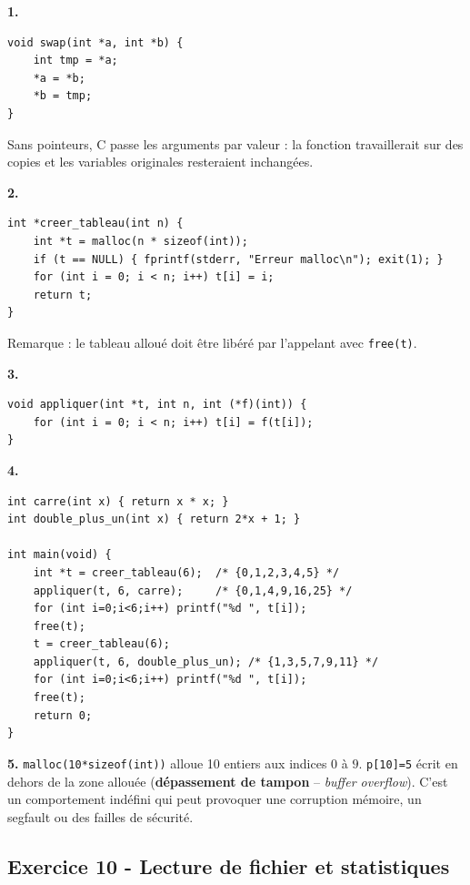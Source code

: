 \documentclass[12pt,a4paper]{article}
\begin{document}
\begin{boitecorrige}
\textbf{1.}
\begin{lstlisting}
void swap(int *a, int *b) {
    int tmp = *a;
    *a = *b;
    *b = tmp;
}
\end{lstlisting}
Sans pointeurs, C passe les arguments par valeur : la fonction travaillerait sur des copies et les variables originales resteraient inchangées.

\textbf{2.}
\begin{lstlisting}
int *creer_tableau(int n) {
    int *t = malloc(n * sizeof(int));
    if (t == NULL) { fprintf(stderr, "Erreur malloc\n"); exit(1); }
    for (int i = 0; i < n; i++) t[i] = i;
    return t;
}
\end{lstlisting}
Remarque : le tableau alloué doit être libéré par l'appelant avec \texttt{free(t)}.

\textbf{3.}
\begin{lstlisting}
void appliquer(int *t, int n, int (*f)(int)) {
    for (int i = 0; i < n; i++) t[i] = f(t[i]);
}
\end{lstlisting}

\textbf{4.}
\begin{lstlisting}
int carre(int x) { return x * x; }
int double_plus_un(int x) { return 2*x + 1; }

int main(void) {
    int *t = creer_tableau(6);  /* {0,1,2,3,4,5} */
    appliquer(t, 6, carre);     /* {0,1,4,9,16,25} */
    for (int i=0;i<6;i++) printf("%d ", t[i]);
    free(t);
    t = creer_tableau(6);
    appliquer(t, 6, double_plus_un); /* {1,3,5,7,9,11} */
    for (int i=0;i<6;i++) printf("%d ", t[i]);
    free(t);
    return 0;
}
\end{lstlisting}

\textbf{5.} \texttt{malloc(10*sizeof(int))} alloue 10 entiers aux indices $0$ à $9$. \texttt{p[10]=5} écrit en dehors de la zone allouée (\textbf{dépassement de tampon} -- \textit{buffer overflow}). C'est un comportement indéfini qui peut provoquer une corruption mémoire, un segfault ou des failles de sécurité.
\end{boitecorrige}

\subsection*{Exercice 10 - Lecture de fichier et statistiques \niveau{\moyen}}
\end{document}
